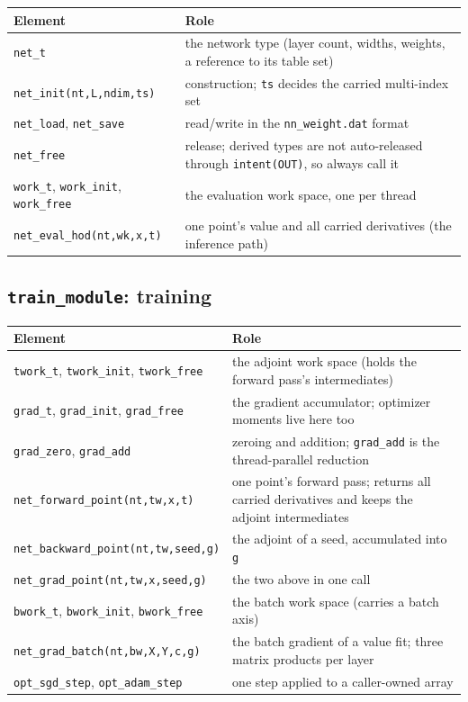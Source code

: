 \documentclass[10pt,a4paper]{article}
\newcommand{\code}[1]{\texttt{#1}}
\begin{document}
\begin{longtable}{@{}p{}p{}@{}}
\toprule
Element & Role \\
\midrule
\endhead
\code{net\_t} & the network type (layer count, widths, weights, a reference to its table set)\\
\code{net\_init(nt,L,ndim,ts)} & construction; \code{ts} decides the carried multi-index set\\
\code{net\_load}, \code{net\_save} & read/write in the \code{nn\_weight.dat} format\\
\code{net\_free} & release; derived types are not auto-released through \code{intent(OUT)}, so always call it\\
\code{work\_t}, \code{work\_init}, \code{work\_free} & the evaluation work space, one per thread\\
\code{net\_eval\_hod(nt,wk,x,t)} & one point's value and all carried derivatives (the inference path)\\
\bottomrule
\end{longtable}

\subsection{\code{train\_module}: training}

\begin{longtable}{@{}p{}p{}@{}}
\toprule
Element & Role \\
\midrule
\endhead
\code{twork\_t}, \code{twork\_init}, \code{twork\_free} & the adjoint work space (holds the forward pass's intermediates)\\
\code{grad\_t}, \code{grad\_init}, \code{grad\_free} & the gradient accumulator; optimizer moments live here too\\
\code{grad\_zero}, \code{grad\_add} & zeroing and addition; \code{grad\_add} is the thread-parallel reduction\\
\code{net\_forward\_point(nt,tw,x,t)} & one point's forward pass; returns all carried derivatives and keeps the adjoint intermediates\\
\code{net\_backward\_point(nt,tw,seed,g)} & the adjoint of a seed, accumulated into \code{g}\\
\code{net\_grad\_point(nt,tw,x,seed,g)} & the two above in one call\\
\code{bwork\_t}, \code{bwork\_init}, \code{bwork\_free} & the batch work space (carries a batch axis)\\
\code{net\_grad\_batch(nt,bw,X,Y,c,g)} & the batch gradient of a value fit; three matrix products per layer\\
\code{opt\_sgd\_step}, \code{opt\_adam\_step} & one step applied to a caller-owned array\\
\bottomrule
\end{longtable}
\end{document}
